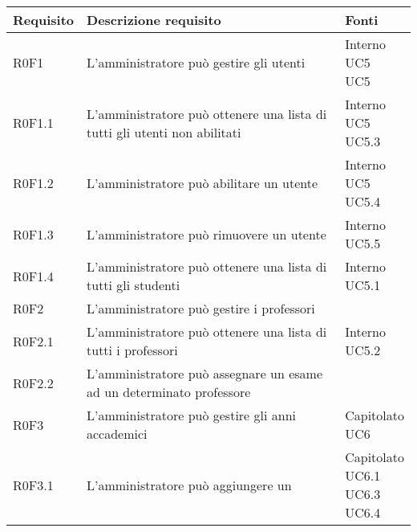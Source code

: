 \documentclass[AnalisiDeiRequisiti.tex]{subfiles}
\begin{document}
\label{table:Tabella di tracciamento requisiti-fonti}
\renewcommand*{\arraystretch}{1.2}
\begin{longtable}[H]{p{2cm}p{5.2cm}p{5cm}}
	\rowcolor{CHeader} 
	\color{CHeaderText} \textbf{Requisito} & \color{CHeaderText} \textbf{Descrizione requisito} & \color{CHeaderText} \textbf{Fonti} \\  
	\endhead
	R0F1 &  L'amministratore può gestire gli utenti & \makecell[tl]{
		Interno \\
		UC5 \\
		UC5
	} \\  
	R0F1.1 &  L'amministratore può ottenere una lista di tutti gli utenti non abilitati & \makecell[tl]{
		Interno \\ 
		UC5 \\  
		UC5.3
	} \\  
	R0F1.2 &  L'amministratore può abilitare un utente & \makecell[tl]{
		Interno \\ 
		UC5 \\ 
		UC5.4
	} \\  
	R0F1.3 &  L'amministratore può rimuovere un utente & \makecell[tl]{
		Interno \\ 
		UC5.5
	} \\  
	R0F1.4 &  L'amministratore può ottenere una lista di tutti gli studenti & \makecell[tl]{
		Interno \\  
		UC5.1
	} \\  
	R0F2 &  L'amministratore può gestire i professori & \makecell[tl]{
		Interno
	} \\  
	R0F2.1 &  L'amministratore può ottenere una lista di tutti i professori & \makecell[tl]{
		Interno \\ 
		UC5.2 
	} \\  
	R0F2.2 &  L'amministratore può assegnare un esame ad un determinato professore & \makecell[tl]{
		Capitolato
	} \\  
	R0F3 &  L'amministratore può gestire gli anni accademici & \makecell[tl]{
		Capitolato \\ 
		UC6
	} \\  
	R0F3.1 &  L'amministratore può aggiungere un \citGloss{anno accademico} & \makecell[tl]{
		Capitolato \\ 
		UC6.1 \\ 
		UC6.3 \\ 
		UC6.4 \\ 
}
\end{longtable}
\end{document}
